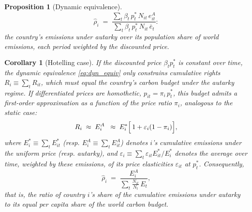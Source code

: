 \documentclass[12pt,english]{article}
\newtheorem{proposition}{Proposition}
\newtheorem{corollary}{Corollary}
\theoremstyle{remark}
\begin{document}
\begin{proposition}[Dynamic equivalence]
\begin{equation}
  \hat\rho_i \;=\; \frac{\sum_t \beta_t\,p^*_t\,N_{it}\,e^A_{it}}{\sum_t \beta_t\,p^*_t\,N_{it}\,\bar e_t}:%
  \label{eq:rhohat_dyn}
\end{equation}
the country's emissions under autarky over its population share of world emissions, each period weighted by the discounted price. 
\end{proposition}

\begin{corollary}[Hotelling case]\label{cor:hotelling}
If the discounted price $\beta_t p^*_t$ is constant over time, the dynamic equivalence \eqref{eq:dyn_equiv} only constrains cumulative rights $R_i\equiv\sum_t R_{it}$, which must equal the country's carbon budget under the autarky regime. If differentiated prices are homothetic, $p_{it}=\pi_i\,p^*_t$, this budget admits a first-order approximation as a function of the price ratio $\pi_i$, analogous to the static case:
\begin{equation}
  R_i \;\approx\; E^A_i \;\;\approx\; E^*_i\Bigl[\,1+\varepsilon_i(1-\pi_i)\Bigr],
  \label{eq:hotelling_budget}
\end{equation} %
where $E^*_i\equiv\sum_t E^*_{it}$ (resp. $E^A_i\equiv\sum_t E^A_{it}$) denotes $i$'s cumulative emissions under the uniform price (resp. autarky), and $\varepsilon_i\equiv\sum_t \varepsilon_{it}E^*_{it}/E^*_i$ denotes the average over time, weighted by these emissions, of its price elasticities $\varepsilon_{it}$ at $p^*_t$. Consequently,
\begin{equation}
  \hat\rho_i \;=\; \frac{E^A_i}{\sum_t \frac{N_{it}}{N_t}\,E_t},
  \label{eq:rhohat_hotelling}
\end{equation}
that is, the ratio of country $i$'s share of the cumulative emissions under autarky to its equal per capita share of the world carbon budget. %
\end{corollary}
\end{document}
